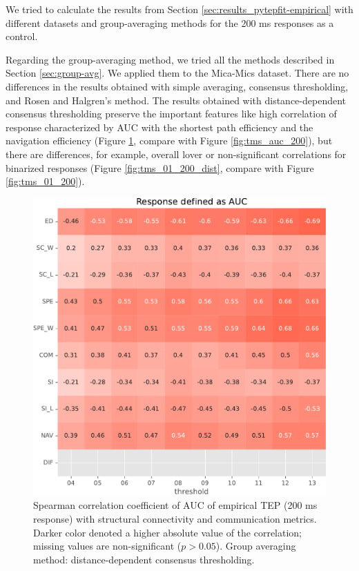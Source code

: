 We tried to calculate the results from Section \ref{sec:results_pytepfit-empirical} with different datasets and group-averaging methods for the 200 ms responses as a control.  

Regarding the group-averaging method, we tried all the methods described in Section \ref{sec:group-avg}. We applied them to the Mica-Mics dataset. There are no differences in the results obtained with simple averaging, consensus thresholding, and Rosen and Halgren's method. The results obtained with distance-dependent consensus thresholding preserve the important features like high correlation of response characterized by AUC with the shortest path efficiency and the navigation efficiency (Figure \ref{fig:tms_auc_200_dist}, compare with Figure \ref{fig:tms_auc_200}), but there are differences, for example, overall lover or non-significant correlations for binarized responses (Figure \ref{fig:tms_01_200_dist}, compare with Figure \ref{fig:tms_01_200}).

\begin{figure}
    \centering
    \includegraphics[width=\textwidth]{images/nootebook_generated/tmseeg_results/empirical/200/not_over_threshold_nan/Mica-Mics_dist/Response defined as AUC.pdf}
    \caption[TEPs AUC (200 ms) correlations (dist)]{Spearman correlation coefficient of AUC of empirical TEP (200 ms response) with structural connectivity and communication metrics. Darker color denoted a higher absolute value of the correlation; missing values are non-significant ($p>0.05$). Group averaging method: distance-dependent consensus thresholding.}
    \label{fig:tms_auc_200_dist}
\end{figure}

